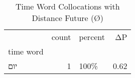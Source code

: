 \begin{table}[htbp!]
\centering
\caption{Time Word Collocations with Distance Future (Ø)}
\label{table:distfutØ_head_cpd}
\begin{tabular}{lrlr}
\toprule
{} &  count & percent &    ΔP \\
time word &        &         &       \\
\midrule
יום       &      1 &    100\% &  0.62 \\
\bottomrule
\end{tabular}
\end{table}
